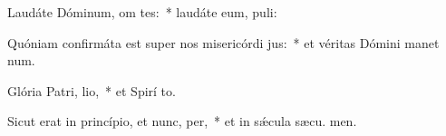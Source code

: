 \item Laudáte Dóminum, om tes:~* laudáte eum,  puli:
\item Quóniam confirmáta est super nos misericórdi jus:~* et véritas Dómini manet  num.
\item Glória Patri,  lio,~* et Spirí to.
\item Sicut erat in princípio, et nunc,  per,~* et in sǽcula sæcu. men.
